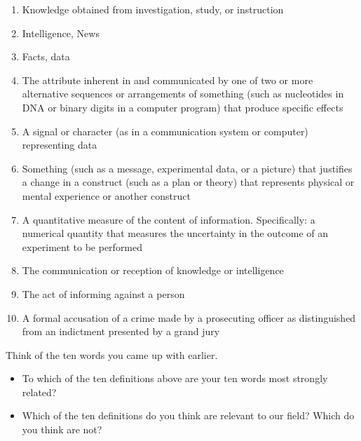 \documentclass[
  letterpaper,
  DIV=11,
  numbers=noendperiod]{scrreprt}
\providecommand{\tightlist}{%
  \setlength{\itemsep}{0pt}\setlength{\parskip}{0pt}}
\begin{document}
\begin{enumerate}
\def\labelenumi{\arabic{enumi}.}
\tightlist
\item
  Knowledge obtained from investigation, study, or instruction
\item
  Intelligence, News
\item
  Facts, data
\item
  The attribute inherent in and communicated by one of two or more
  alternative sequences or arrangements of something (such as
  nucleotides in DNA or binary digits in a computer program) that
  produce specific effects
\item
  A signal or character (as in a communication system or computer)
  representing data
\item
  Something (such as a message, experimental data, or a picture) that
  justifies a change in a construct (such as a plan or theory) that
  represents physical or mental experience or another construct
\item
  A quantitative measure of the content of information. Specifically: a
  numerical quantity that measures the uncertainty in the outcome of an
  experiment to be performed
\item
  The communication or reception of knowledge or intelligence
\item
  The act of informing against a person
\item
  A formal accusation of a crime made by a prosecuting officer as
  distinguished from an indictment presented by a grand jury
\end{enumerate}

\begin{tcolorbox}[enhanced jigsaw, arc=.35mm, bottomrule=.15mm, bottomtitle=1mm, breakable, colback=white, colbacktitle=quarto-callout-tip-color!10!white, colframe=quarto-callout-tip-color-frame, coltitle=black, left=2mm, leftrule=.75mm, opacityback=0, opacitybacktitle=0.6, rightrule=.15mm, title=\textcolor{quarto-callout-tip-color}{\faLightbulb}\hspace{0.5em}{Stop and reflect}, titlerule=0mm, toprule=.15mm, toptitle=1mm]

Think of the ten words you came up with earlier.

\begin{itemize}
\item
  To which of the ten definitions above are your ten words most strongly
  related?
\item
  Which of the ten definitions do you think are relevant to our field?
  Which do you think are not?
\end{itemize}

\end{tcolorbox}
\end{document}
